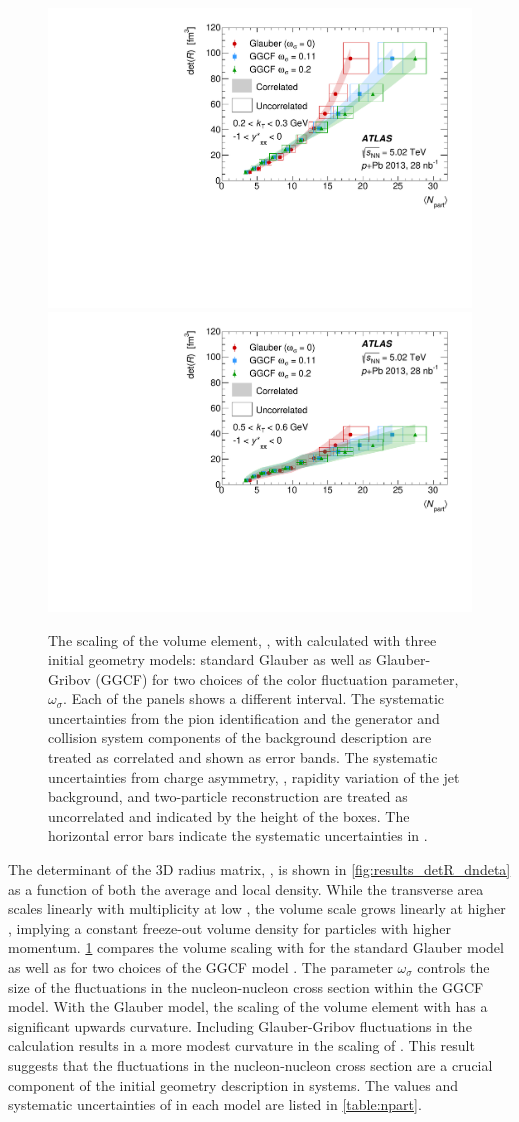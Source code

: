 \begin{figure}[t]
\centering
\includegraphics[width=0.49\linewidth]{canqosl_detR_kt1_ggcf.pdf}
\includegraphics[width=0.49\linewidth]{canqosl_detR_kt4_ggcf.pdf}\\
\caption{The scaling of the volume element, \detR, with \avgNpart calculated with three initial geometry models: standard Glauber as well as Glauber-Gribov (GGCF) for two choices of the color fluctuation parameter, $\omega_\sigma$.
Each of the panels shows a different \kt interval.
The systematic uncertainties from the pion identification and the generator and collision system components of the background description are treated as correlated and shown as error bands.
The systematic uncertainties from charge asymmetry, \Reff, rapidity variation of the jet background, and two-particle reconstruction are treated as uncorrelated and indicated by the height of the boxes.
The horizontal error bars indicate the systematic uncertainties in \avgNpart.}
\label{fig:results_detR_ggcf}
\end{figure}

The determinant of the 3D radius matrix, \detR, is shown in \cref{fig:results_detR_dndeta} as a function of both the average and local density.
While the transverse area scales linearly with  multiplicity at low \kt, the volume scale grows linearly at higher \kt, implying a constant freeze-out volume density for particles with higher momentum.
\cref{fig:results_detR_ggcf} compares the volume scaling with \avgNpart for the standard Glauber model as well as for two choices of the \ac{GGCF} model \cite{Alvioli:2013vk}.
The parameter $\omega_{\sigma}$ controls the size of the fluctuations in the nucleon-nucleon cross section within the \ac{GGCF} model.
With the Glauber model, the scaling of the volume element with \avgNpart has a significant upwards curvature.
Including Glauber-Gribov fluctuations in the \avgNpart calculation results in a more modest curvature in the scaling of \detR.
This result suggests that the fluctuations in the nucleon-nucleon cross section are a crucial component of the initial geometry description in \pPb systems.
The values and systematic uncertainties of \avgNpart in each model are listed in \cref{table:npart}.

